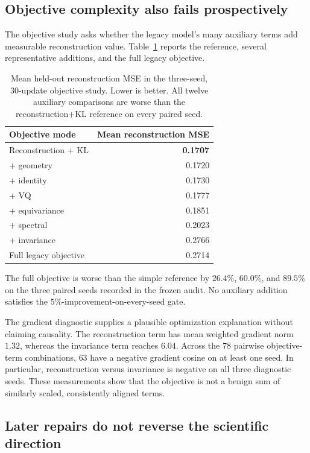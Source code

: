 \documentclass[10pt]{article}
\begin{document}
\subsection{Objective complexity also fails prospectively}

The objective study asks whether the legacy model's many auxiliary terms add measurable reconstruction value. Table~\ref{tab:objective} reports the reference, several representative additions, and the full legacy objective.

\begin{table}[t]
\centering
\caption{Mean held-out reconstruction MSE in the three-seed, 30-update objective study. Lower is better. All twelve auxiliary comparisons are worse than the reconstruction+KL reference on every paired seed.}
\label{tab:objective}
\begin{tabular}{lr}
\toprule
Objective mode & Mean reconstruction MSE\\
\midrule
Reconstruction + KL & \textbf{0.1707}\\
+ geometry & 0.1720\\
+ identity & 0.1730\\
+ VQ & 0.1777\\
+ equivariance & 0.1851\\
+ spectral & 0.2023\\
+ invariance & 0.2766\\
Full legacy objective & 0.2714\\
\bottomrule
\end{tabular}
\end{table}

The full objective is worse than the simple reference by $26.4\%$, $60.0\%$, and $89.5\%$ on the three paired seeds recorded in the frozen audit. No auxiliary addition satisfies the $5\%$-improvement-on-every-seed gate.

The gradient diagnostic supplies a plausible optimization explanation without claiming causality. The reconstruction term has mean weighted gradient norm $1.32$, whereas the invariance term reaches $6.04$. Across the $78$ pairwise objective-term combinations, $63$ have a negative gradient cosine on at least one seed. In particular, reconstruction versus invariance is negative on all three diagnostic seeds. These measurements show that the objective is not a benign sum of similarly scaled, consistently aligned terms.

\subsection{Later repairs do not reverse the scientific direction}
\end{document}
